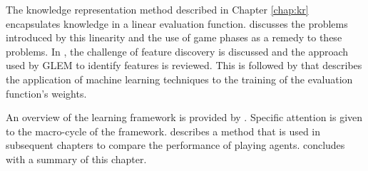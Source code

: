 The knowledge representation method described in Chapter \ref{chap:kr} encapsulates knowledge in a linear evaluation function.  discusses the problems introduced by this linearity and the use of game phases as a remedy to these problems. In , the challenge of feature discovery is discussed and the approach used by GLEM to identify features is reviewed.  This is followed by  that describes the application of machine learning techniques to the training of the evaluation function's weights.

An overview of the learning framework is provided by
.  Specific attention is given to the macro-cycle of the framework. 
 describes a method that is used in subsequent chapters to compare the performance of playing agents.  concludes with a summary of this chapter. 
%
%
%
%
%  
%

